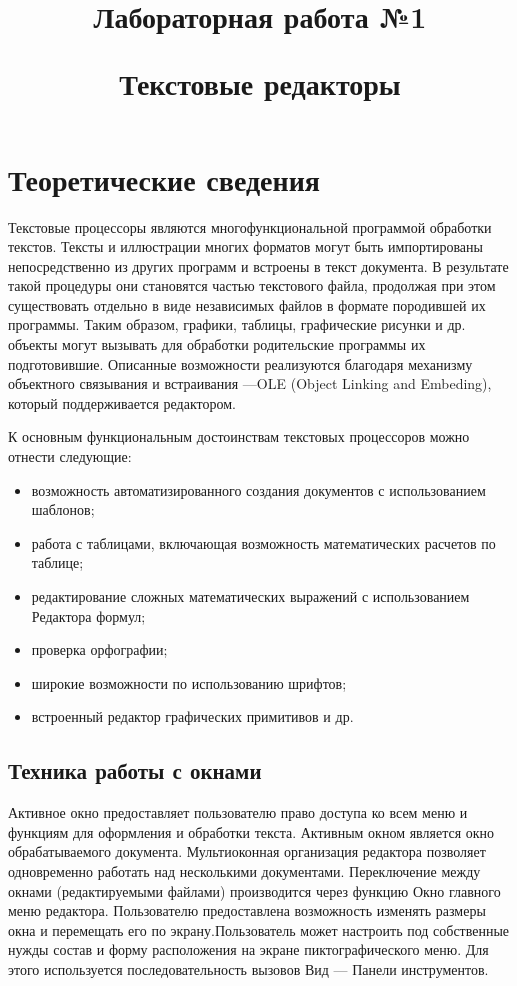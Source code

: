 \documentclass[a4paper]{article}
\title{\bfseries Лабораторная работа №1
  
Текстовые редакторы}
\date{}
\begin{document}
\maketitle

\section{Теоретические сведения}

Текстовые процессоры являются многофункциональной программой обработки текстов. Тексты и иллюстрации многих форматов могут быть импортированы непосредственно из других программ и встроены в текст документа. В результате такой процедуры они становятся частью текстового файла, продолжая при этом существовать отдельно в виде независимых файлов в формате породившей их программы. Таким образом, графики, таблицы, графические рисунки и др. объекты могут вызывать для обработки родительские программы их подготовившие. Описанные возможности реализуются благодаря механизму объектного связывания и встраивания ---OLE (Object Linking and Embeding), который поддерживается редактором.

К основным функциональным достоинствам текстовых процессоров можно отнести следующие:
\begin{itemize}
  \item возможность автоматизированного создания документов с использованием шаблонов;
  \item работа с таблицами, включающая возможность математических расчетов по таблице;
  \item редактирование сложных математических выражений с использованием Редактора формул;
  \item проверка орфографии;
  \item широкие возможности по использованию шрифтов;
  \item встроенный редактор графических примитивов и др.
\end{itemize}

\subsection{Техника работы с окнами}
Активное окно предоставляет пользователю право доступа ко всем меню и функциям для оформления и обработки текста. Активным окном является окно обрабатываемого документа. Мультиоконная организация редактора позволяет одновременно работать над несколькими документами. Переключение между окнами (редактируемыми файлами) производится через функцию Окно главного меню редактора. Пользователю предоставлена возможность изменять размеры окна и перемещать его по экрану.Пользователь может настроить под собственные нужды состав и форму расположения на экране пиктографического меню. Для этого используется последовательность вызовов Вид --- Панели инструментов.
\end{document}
